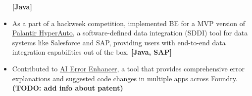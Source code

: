 \begin{itemize}
{    }
    \textbf{[Java]}
    \item {
        As a part of a hackweek competition, implemented BE for a MVP version of
        \href{https://www.palantir.com/docs/foundry/hyperauto/overview/}{Palantir HyperAuto},
        a software-defined data integration (SDDI) tool for data systems like Salesforce and SAP,
        providing users with end-to-end data integration capabilities out of the box.
    }
    \textbf{[Java, SAP]}
    \item {
        Contributed to
        \href{https://www.palantir.com/docs/foundry/code-repositories/aip-features/#ai-error-enhancer}{AI Error Enhancer},
        a tool that provides comprehensive error explanations and suggested code changes in multiple apps across Foundry.
    }
    \textbf{(TODO: add info about patent)}
\end{itemize}
